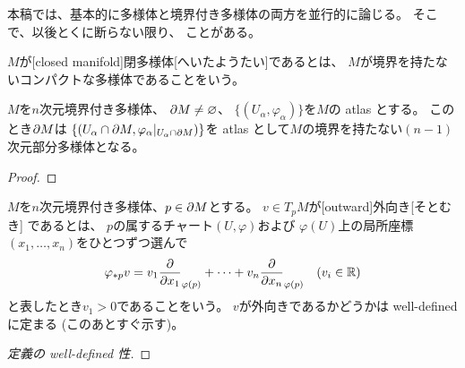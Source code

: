 \documentclass[report]{jlreq}
\begin{document}
\begin{remark}[多様体の境界]
    本稿では、基本的に多様体と境界付き多様体の両方を並行的に論じる。
    そこで、以後とくに断らない限り、
    ことがある。
\end{remark}

\begin{definition}[閉多様体]
    $M$が[closed manifold]{閉多様体}[へいたようたい]であるとは、
    $M$が境界を持たないコンパクトな多様体であることをいう。
\end{definition}

\begin{proposition}[境界の多様体構造]
    $M$を$n$次元境界付き多様体、
    $\partial M \neq \varnothing$、
    $\{ (U_\alpha, \varphi_\alpha) \}$を$M$の atlas とする。
    このとき$\partial M$は
    $\{ (U_\alpha \cap \partial M, \varphi_\alpha|_{U_\alpha \cap \partial M}) \}$を
    atlas として$M$の境界を持たない$(n - 1)$次元部分多様体となる。
\end{proposition}

\begin{proof}
\end{proof}

\begin{definition}[境界付き多様体の接空間]
    \TODO{}
\end{definition}

\begin{definition}[外向き接ベクトル]
    $M$を$n$次元境界付き多様体、$p \in \partial M$とする。
    $v \in T_pM$が[outward]{外向き}[そとむき]
    であるとは、
    $p$の属するチャート$(U, \varphi)$および
    $\varphi(U)$上の局所座標$(x_1, \dots, x_n)$をひとつずつ選んで
    \begin{equation}
        \varphi_{*p} v
            = v_1 \deldel{x_1}_{\varphi(p)}
            + \cdots
            + v_n \deldel{x_n}_{\varphi(p)}
            \quad (v_i \in \R)
    \end{equation}
    と表したとき$v_1 > 0$であることをいう。
    $v$が外向きであるかどうかは well-defined に定まる (このあとすぐ示す)。
\end{definition}

\begin{proof}[定義の well-defined 性]
    \TODO{}
\end{proof}

%
\end{document}
